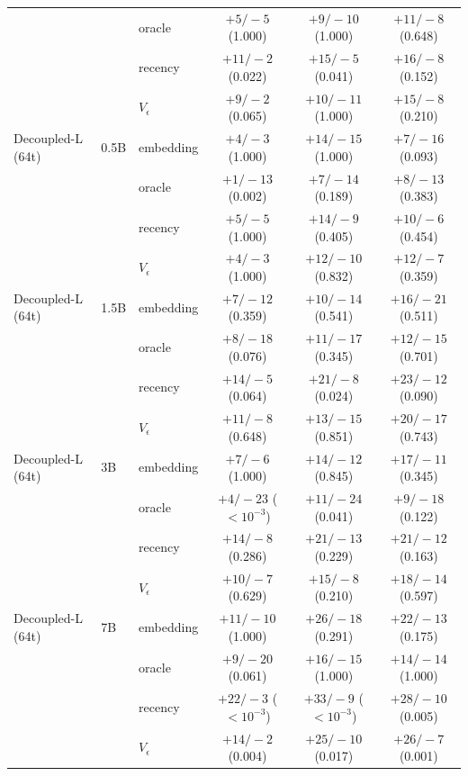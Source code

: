 {\begin{longtable}{lllccc}
 &  & oracle & $+5/-5$ (1.000) & $+9/-10$ (1.000) & $+11/-8$ (0.648) \\
 &  & recency & $+11/-2$ (0.022) & $+15/-5$ (0.041) & $+16/-8$ (0.152) \\
 &  & $V_\epsilon$ & $+9/-2$ (0.065) & $+10/-11$ (1.000) & $+15/-8$ (0.210) \\
Decoupled-L (64t) & 0.5B & embedding & $+4/-3$ (1.000) & $+14/-15$ (1.000) & $+7/-16$ (0.093) \\
 &  & oracle & $+1/-13$ (0.002) & $+7/-14$ (0.189) & $+8/-13$ (0.383) \\
 &  & recency & $+5/-5$ (1.000) & $+14/-9$ (0.405) & $+10/-6$ (0.454) \\
 &  & $V_\epsilon$ & $+4/-3$ (1.000) & $+12/-10$ (0.832) & $+12/-7$ (0.359) \\
Decoupled-L (64t) & 1.5B & embedding & $+7/-12$ (0.359) & $+10/-14$ (0.541) & $+16/-21$ (0.511) \\
 &  & oracle & $+8/-18$ (0.076) & $+11/-17$ (0.345) & $+12/-15$ (0.701) \\
 &  & recency & $+14/-5$ (0.064) & $+21/-8$ (0.024) & $+23/-12$ (0.090) \\
 &  & $V_\epsilon$ & $+11/-8$ (0.648) & $+13/-15$ (0.851) & $+20/-17$ (0.743) \\
Decoupled-L (64t) & 3B & embedding & $+7/-6$ (1.000) & $+14/-12$ (0.845) & $+17/-11$ (0.345) \\
 &  & oracle & $+4/-23$ ($<\!10^{-3}$) & $+11/-24$ (0.041) & $+9/-18$ (0.122) \\
 &  & recency & $+14/-8$ (0.286) & $+21/-13$ (0.229) & $+21/-12$ (0.163) \\
 &  & $V_\epsilon$ & $+10/-7$ (0.629) & $+15/-8$ (0.210) & $+18/-14$ (0.597) \\
Decoupled-L (64t) & 7B & embedding & $+11/-10$ (1.000) & $+26/-18$ (0.291) & $+22/-13$ (0.175) \\
 &  & oracle & $+9/-20$ (0.061) & $+16/-15$ (1.000) & $+14/-14$ (1.000) \\
 &  & recency & $+22/-3$ ($<\!10^{-3}$) & $+33/-9$ ($<\!10^{-3}$) & $+28/-10$ (0.005) \\
 &  & $V_\epsilon$ & $+14/-2$ (0.004) & $+25/-10$ (0.017) & $+26/-7$ (0.001) \\
\end{longtable}}
